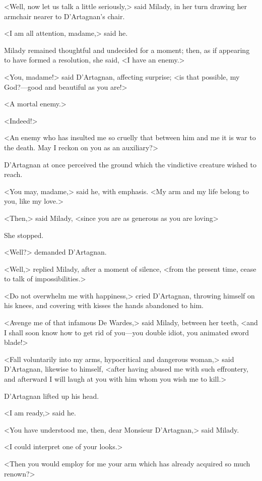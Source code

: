 <Well, now let us talk a little seriously,> said Milady, in her turn drawing her armchair nearer to D'Artagnan's chair. 

<I am all attention, madame,> said he. 

Milady remained thoughtful and undecided for a moment; then, as if appearing to have formed a resolution, she said, <I have an enemy.> 

<You, madame!> said D'Artagnan, affecting surprise; <is that possible, my God?—good and beautiful as you are!> 

<A mortal enemy.> 

<Indeed!> 

<An enemy who has insulted me so cruelly that between him and me it is war to the death. May I reckon on you as an auxiliary?> 

D'Artagnan at once perceived the ground which the vindictive creature wished to reach. 

<You may, madame,> said he, with emphasis. <My arm and my life belong to you, like my love.> 

<Then,> said Milady, <since you are as generous as you are loving\longdash> 

She stopped. 

<Well?> demanded D'Artagnan. 

<Well,> replied Milady, after a moment of silence, <from the present time, cease to talk of impossibilities.> 

<Do not overwhelm me with happiness,> cried D'Artagnan, throwing himself on his knees, and covering with kisses the hands abandoned to him. 

<Avenge me of that infamous De Wardes,> said Milady, between her teeth, <and I shall soon know how to get rid of you—you double idiot, you animated sword blade!> 

<Fall voluntarily into my arms, hypocritical and dangerous woman,> said D'Artagnan, likewise to himself, <after having abused me with such effrontery, and afterward I will laugh at you with him whom you wish me to kill.> 

D'Artagnan lifted up his head. 

<I am ready,> said he. 

<You have understood me, then, dear Monsieur D'Artagnan,> said Milady. 

<I could interpret one of your looks.> 

<Then you would employ for me your arm which has already acquired so much renown?> 


